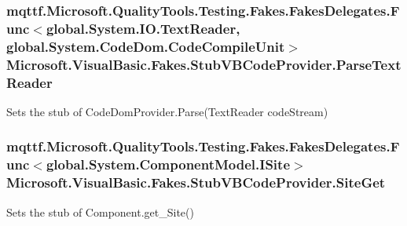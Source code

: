 \hypertarget{class_microsoft_1_1_visual_basic_1_1_fakes_1_1_stub_v_b_code_provider_a6e8858c1aff550db4cd7dc8dcc49606f}{
\subsubsection[{Parse\-Text\-Reader}]{\setlength{\rightskip}{0pt plus 5cm}mqttf.\-Microsoft.\-Quality\-Tools.\-Testing.\-Fakes.\-Fakes\-Delegates.\-Func$<$global.\-System.\-I\-O.\-Text\-Reader, global.\-System.\-Code\-Dom.\-Code\-Compile\-Unit$>$ Microsoft.\-Visual\-Basic.\-Fakes.\-Stub\-V\-B\-Code\-Provider.\-Parse\-Text\-Reader}}\label{class_microsoft_1_1_visual_basic_1_1_fakes_1_1_stub_v_b_code_provider_a6e8858c1aff550db4cd7dc8dcc49606f}


Sets the stub of Code\-Dom\-Provider.\-Parse(\-Text\-Reader code\-Stream)

\hypertarget{class_microsoft_1_1_visual_basic_1_1_fakes_1_1_stub_v_b_code_provider_afcd038c40a0e25b6cf2feea9f7e8e2a0}{
\subsubsection[{Site\-Get}]{\setlength{\rightskip}{0pt plus 5cm}mqttf.\-Microsoft.\-Quality\-Tools.\-Testing.\-Fakes.\-Fakes\-Delegates.\-Func$<$global.\-System.\-Component\-Model.\-I\-Site$>$ Microsoft.\-Visual\-Basic.\-Fakes.\-Stub\-V\-B\-Code\-Provider.\-Site\-Get}}\label{class_microsoft_1_1_visual_basic_1_1_fakes_1_1_stub_v_b_code_provider_afcd038c40a0e25b6cf2feea9f7e8e2a0}


Sets the stub of Component.\-get\-\_\-\-Site()


